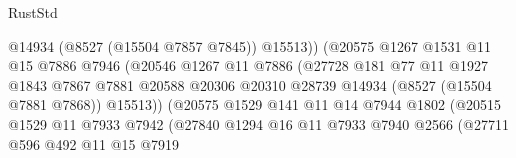 \begin{lexlean}{RustStd}
\begin{coremodule}
                                        @14934
                                        (@8527 (@15504 @7857 @7845))
                                        @15513))
                                    (@20575
                                      @1267
                                      @1531
                                      @11
                                      @15
                                      @7886
                                      @7946
                                      (@20546
                                        @1267
                                        @11
                                        @7886
                                        (@27728
                                          @181
                                          @77
                                          @11
                                          @1927
                                          @1843
                                          @7867
                                          @7881
                                          @20588
                                          @20306
                                          @20310
                                          @28739
                                          @14934
                                          (@8527 (@15504 @7881 @7868))
                                          @15513))
                                      (@20575
                                        @1529
                                        @141
                                        @11
                                        @14
                                        @7944
                                        @1802
                                        (@20515
                                          @1529
                                          @11
                                          @7933
                                          @7942
                                          (@27840
                                            @1294
                                            @16
                                            @11
                                            @7933
                                            @7940
                                            @2566
                                            (@27711
                                              @596
                                              @492
                                              @11
                                              @15
                                              @7919

\end{coremodule}
\end{lexlean}
